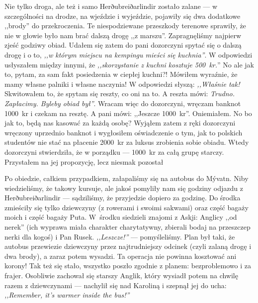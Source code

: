 \pagebreak


\pagebreak

Nie tylko droga, ale też i samo Herðubreiðarlindir zostało zalane --- w szczególności na drodze, na wjeździe i wyjeździe, pojawiły się dwa dodatkowe ,,brody'' do przekroczenia. Te niespodziewane przeszkody terenowe sprawiły, że nie w głowie było nam brać dalszą drogę ,,z marszu''. Zapragnęliśmy najpierw zjeść godziwy obiad. Udałem się zatem do pani dozorczyni spytać się o dalszą drogę i o to, \emph{,,w którym miejscu na kempingu mieści się kuchnia''}. W odpowiedzi usłyszałem między innymi, że \emph{,,skorzystanie z kuchni kosztuje 500~kr.}'' No ale jak to, pytam, za sam fakt posiedzenia w ciepłej kuchni?! Mówiłem wyraźnie, że mamy własne palniki i własne naczynia! W odpowiedzi słyszą: \emph{,,Właśnie tak!} Skwitowałem to, że spytam się reszty, co oni na to. A reszta mówi: \emph{Trudno. Zapłacimy. Byleby obiad był\textellipsis''}. Wracam więc do dozorczyni, wręczam banknot 1000~kr i czekam na resztę. A pani mówi: ,,Jeszcze 1000~kr''. Oniemiałem. No bo jak to, będą nas kasować za każdą osobę? Wyjąłem zatem z ręki dozorczyni wręczony uprzednio banknot i wygłosiłem oświadczenie o tym, jak to polskich studentów nie stać na płacenie 2000~kr za luksus zrobienia sobie obiadu. Wtedy dozorczyni stwierdziła, że w porządku --- 1000~kr za całą grupę starczy. Przystałem na jej propozycję, lecz niesmak pozostał\textellipsis

Po obiedzie, całkiem przypadkiem, załapaliśmy się na autobus do Mývatn. Niby wiedzieliśmy, że takowy kursuje, ale jakoś pomyliły nam się godziny odjazdu z Herðubreiðarlindir --- sądziliśmy, że przyjedzie dopiero za godzinę. Do środka zmieściły się tylko dziewczyny (z rowerami i swoimi sakwami) oraz część bagaży moich i część bagaży Puta. W~środku siedzieli znajomi z Askji: Anglicy ,,od nerek'' (ich wyprawa miała charakter charytatywny, zbierali bodaj na przeszczep nerki dla kogoś) i Pan Rusek. \emph{,,Leszcze!''} --- pomyśleliśmy. Plan był taki, że autobus przewiezie dziewczyny przez najtrudniejszy odcinek (czyli zalaną drogę i dwa brody), a zaraz potem wysadzi. Ta operacja nie powinna kosztować ani korony! Tak też się stało, wszystko poszło zgodnie z planem: bezproblemowo i za frajer. Osobliwie zachował się starszy Anglik, który wysiadł potem na chwilę razem z dziewczynami --- nachylił się nad Karoliną i szepnął jej do ucha: \emph{,,Remember, it’s warmer inside the bus!''}

